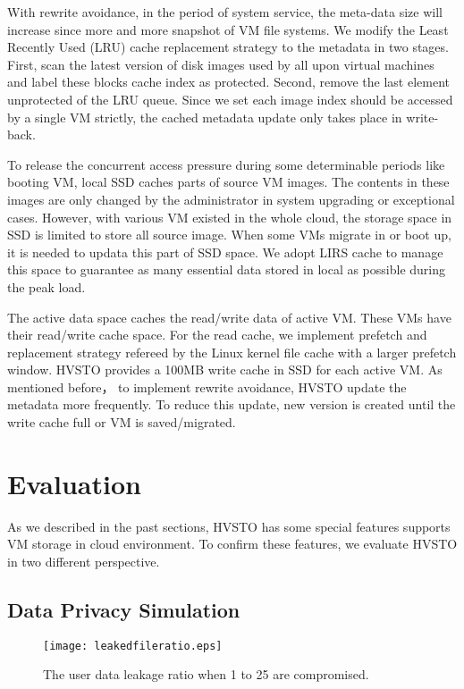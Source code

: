 \documentclass[conference]{IEEEtran}
\begin{document}
With rewrite avoidance, in the period of system service, the meta-data size will increase since more and more snapshot of VM file systems. We modify the Least Recently Used (LRU) cache replacement strategy to the metadata in two stages. First, scan the latest version of disk images used by all upon virtual machines and label these blocks cache index as protected. Second, remove the last element unprotected of the LRU queue. Since we set each image index should be accessed by a single VM strictly, the cached metadata update only takes place in write-back.

To release the concurrent access pressure during some determinable periods like booting VM, local SSD caches parts of source VM images. The contents in these images are only changed by the administrator in system upgrading or exceptional cases. However, with various VM existed in the whole cloud, the storage space in SSD is limited to store all source image. When some VMs migrate in or boot up, it is needed to updata this part of SSD space. We adopt LIRS cache \cite{Jiang2002} to manage this space to guarantee as many essential data stored in local as possible during the peak load.

The active data space caches the read/write data of active VM.  These VMs have their read/write cache space. For the read cache, we implement prefetch and replacement strategy refereed by the Linux kernel file cache with a larger prefetch window. HVSTO provides a 100MB write cache in SSD for each active VM. As mentioned before， to implement rewrite avoidance, HVSTO update the metadata more frequently. To reduce this update, new version is created until the write cache full or VM is saved/migrated. 


\section{Evaluation}
\label{sec:eva}
As we described in the past sections, HVSTO has some special features supports VM storage in cloud environment. To confirm these features, we evaluate HVSTO in two different perspective. 
\subsection{Data Privacy Simulation}
\begin{figure}[!ht]
\centering
\texttt{[image: leakedfileratio.eps]}
\caption{The user data leakage ratio when 1 to 25 are compromised.}
\label{figure:security}
\end{figure}
\end{document}

